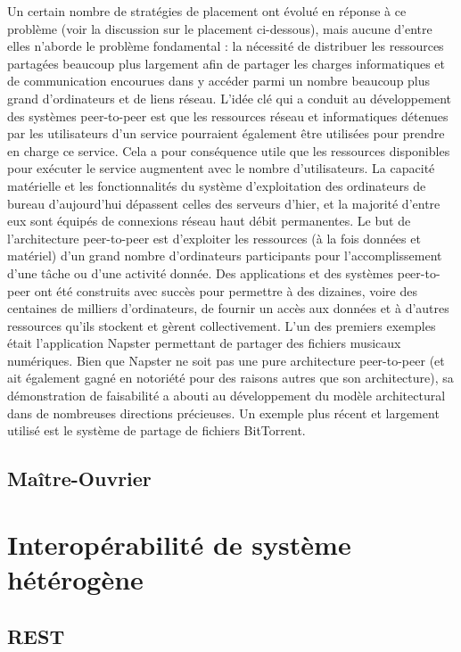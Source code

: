 Un certain nombre de stratégies de placement ont évolué en réponse à ce problème (voir la discussion sur le placement ci-dessous), mais aucune d'entre elles n'aborde le problème fondamental : la nécessité de distribuer les ressources partagées beaucoup plus largement afin de partager les charges informatiques et de communication encourues dans y accéder parmi un nombre beaucoup plus grand d'ordinateurs et de liens réseau. L'idée clé qui a conduit au développement des systèmes peer-to-peer est que les ressources réseau et informatiques détenues par les utilisateurs d'un service pourraient également être utilisées pour prendre en charge ce service. Cela a pour conséquence utile que les ressources disponibles pour exécuter le service augmentent avec le nombre d'utilisateurs. La capacité matérielle et les fonctionnalités du système d'exploitation des ordinateurs de bureau d'aujourd'hui dépassent celles des serveurs d'hier, et la majorité d'entre eux sont équipés de connexions réseau haut débit permanentes. Le but de l'architecture peer-to-peer est d'exploiter les ressources (à la fois données et matériel) d'un grand nombre d'ordinateurs participants pour l'accomplissement d'une tâche ou d'une activité donnée. Des applications et des systèmes peer-to-peer ont été construits avec succès pour permettre à des dizaines, voire des centaines de milliers d'ordinateurs, de fournir un accès aux données et à d'autres ressources qu'ils stockent et gèrent collectivement. L'un des premiers exemples était l'application Napster permettant de partager des fichiers musicaux numériques. Bien que Napster ne soit pas une pure architecture peer-to-peer (et ait également gagné en notoriété pour des raisons autres que son architecture), sa démonstration de faisabilité a abouti au développement du modèle architectural dans de nombreuses directions précieuses. Un exemple plus récent et largement utilisé est le système de partage de fichiers BitTorrent. \cite{toole2006bittorrent}

\subsection{Maître-Ouvrier}


\section{Interopérabilité de système hétérogène}

\subsection{REST}

